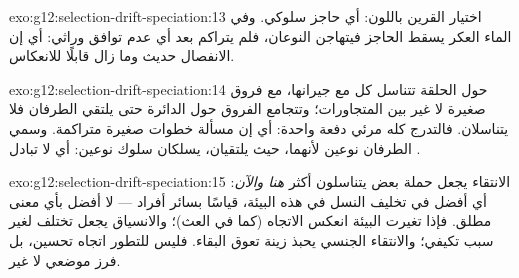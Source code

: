 \begin{solution}{exo:g12:selection-drift-speciation:13}
اختيار القرين باللون: أي حاجز سلوكي. وفي الماء العكر يسقط الحاجز
فيتهاجن النوعان، فلم يتراكم بعد أي عدم توافق وراثي: أي إن الانفصال
حديث وما زال قابلًا للانعكاس.
\end{solution}

\begin{solution}{exo:g12:selection-drift-speciation:14}
حول الحلقة تتناسل كل  مع جيرانها، مع فروق صغيرة لا غير بين
المتجاورات؛ وتتجامع الفروق حول الدائرة حتى يلتقي الطرفان فلا يتناسلان.
فالتدرج كله مرئي دفعة واحدة: أي إن  مسألة خطوات صغيرة متراكمة.
وسمي الطرفان نوعين لأنهما، حيث يلتقيان، يسلكان سلوك نوعين: أي لا تبادل
.
\end{solution}

\begin{solution}{exo:g12:selection-drift-speciation:15}
الانتقاء يجعل حملة بعض  يتناسلون أكثر \emph{هنا والآن}: أي
أفضل في تخليف النسل في هذه البيئة، قياسًا بسائر أفراد  --- لا
أفضل بأي معنى مطلق. فإذا تغيرت البيئة انعكس الاتجاه (كما في العث)؛
والانسياق يجعل  تختلف لغير سبب تكيفي؛ والانتقاء الجنسي يحبذ
زينة تعوق البقاء. فليس للتطور اتجاه تحسين، بل فرز موضعي لا غير.
\end{solution}

